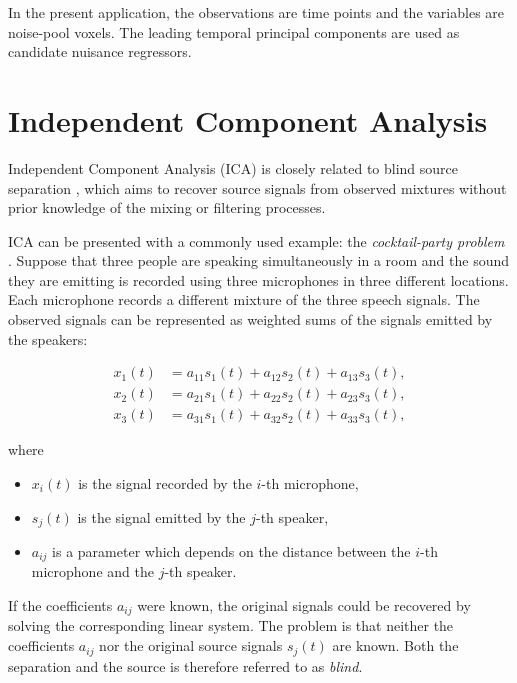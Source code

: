 \documentclass[english]{pwr_wmat_praca_dyplomowa}
\theoremstyle{definition}
\theoremstyle{remark}
\begin{document}
In the present application, the observations are time points and the variables are noise-pool voxels. The leading temporal principal components are used as candidate nuisance regressors.


\newpage
\chapter{Independent Component Analysis}
\label{chapter:ica}

Independent Component Analysis (ICA) is closely related to blind source separation \cite{blind-source-separation}, which aims to recover source signals from observed mixtures without prior knowledge of the mixing or filtering processes.

ICA can be presented with a commonly used example: the \textit{cocktail-party problem} \mbox{\cite[Section 7.1]{ica}}. Suppose that three people are speaking simultaneously in a room and the sound they are emitting is recorded using three microphones in three different locations. Each microphone records a different mixture of the three speech signals. The observed signals can be represented as weighted sums of the signals emitted by the speakers:

\begin{equation}
    \begin{aligned}
        x_1(t) &= a_{11}s_1(t) + a_{12}s_2(t) + a_{13}s_3(t), \\
        x_2(t) &= a_{21}s_1(t) + a_{22}s_2(t) + a_{23}s_3(t), \\
        x_3(t) &= a_{31}s_1(t) + a_{32}s_2(t) + a_{33}s_3(t),
    \end{aligned}
\end{equation}

where

\begin{itemize}
    \item $x_i(t)$ is the signal recorded by the $i$-th microphone,
    \item $s_j(t)$ is the signal emitted by the $j$-th speaker,
    \item $a_{ij}$ is a parameter which depends on the distance between the $i$-th microphone and the  $j$-th speaker.
\end{itemize}

If the coefficients $a_{ij}$ were known, the original signals could be recovered by solving the corresponding linear system. The problem is that neither the coefficients $a_{ij}$ nor the original source signals $s_j(t)$ are known. Both the separation and the source is therefore referred to as \textit{blind}.
\end{document}
